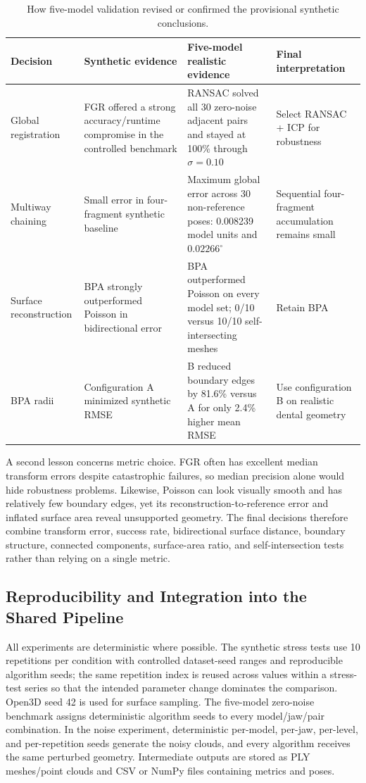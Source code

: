 \begin{table}[!t]
\centering
\footnotesize
\begin{tabularx}{\textwidth}{@{}lYYY@{}}
\toprule
\textbf{Decision} & \textbf{Synthetic evidence} & \textbf{Five-model realistic evidence} & \textbf{Final interpretation} \\
\midrule
Global registration & FGR offered a strong accuracy/runtime compromise in the controlled benchmark & RANSAC solved all 30 zero-noise adjacent pairs and stayed at 100\% through $\sigma=0.10$ & Select RANSAC + ICP for robustness \\
Multiway chaining & Small error in four-fragment synthetic baseline & Maximum global error across 30 non-reference poses: 0.008239 model units and $0.02266^\circ$ & Sequential four-fragment accumulation remains small \\
Surface reconstruction & BPA strongly outperformed Poisson in bidirectional error & BPA outperformed Poisson on every model set; 0/10 versus 10/10 self-intersecting meshes & Retain BPA \\
BPA radii & Configuration A minimized synthetic RMSE & B reduced boundary edges by 81.6\% versus A for only 2.4\% higher mean RMSE & Use configuration B on realistic dental geometry \\
\bottomrule
\end{tabularx}
\caption{How five-model validation revised or confirmed the provisional synthetic conclusions.}
\label{tab:synthetic-vs-realistic-discussion}
\end{table}

A second lesson concerns metric choice. FGR often has excellent median transform errors despite catastrophic failures, so median precision alone would hide robustness problems. Likewise, Poisson can look visually smooth and has relatively few boundary edges, yet its reconstruction-to-reference error and inflated surface area reveal unsupported geometry. The final decisions therefore combine transform error, success rate, bidirectional surface distance, boundary structure, connected components, surface-area ratio, and self-intersection tests rather than relying on a single metric.

\subsection{Reproducibility and Integration into the Shared Pipeline}
\label{sec:marvin-reproducibility}

All experiments are deterministic where possible. The synthetic stress tests use 10 repetitions per condition with controlled dataset-seed ranges and reproducible algorithm seeds; the same repetition index is reused across values within a stress-test series so that the intended parameter change dominates the comparison. Open3D seed 42 is used for surface sampling. The five-model zero-noise benchmark assigns deterministic algorithm seeds to every model/jaw/pair combination. In the noise experiment, deterministic per-model, per-jaw, per-level, and per-repetition seeds generate the noisy clouds, and every algorithm receives the same perturbed geometry. Intermediate outputs are stored as PLY meshes/point clouds and CSV or NumPy files containing metrics and poses.

